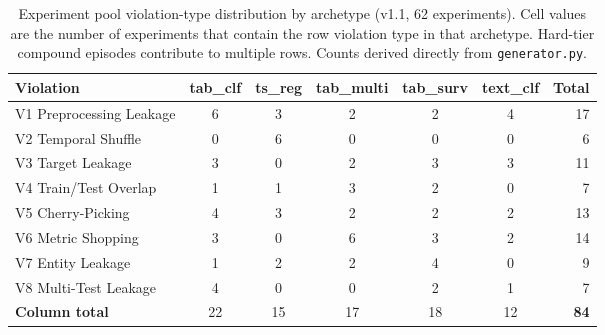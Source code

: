 \documentclass{article}
\begin{document}
\begin{table}[h]
\centering
\caption{Experiment pool violation-type distribution by archetype (v1.1,
62 experiments). Cell values are the number of experiments that contain
the row violation type in that archetype. Hard-tier compound episodes
contribute to multiple rows. Counts derived directly from
\texttt{generator.py}.}
\label{tab:pool}
\small
\begin{tabular}{lcccccr}
\toprule
\textbf{Violation} & \textbf{tab\_clf} & \textbf{ts\_reg} & \textbf{tab\_multi} & \textbf{tab\_surv} & \textbf{text\_clf} & \textbf{Total} \\
\midrule
V1 Preprocessing Leakage & 6 & 3 & 2 & 2 & 4 & 17 \\
V2 Temporal Shuffle       & 0 & 6 & 0 & 0 & 0 &  6 \\
V3 Target Leakage         & 3 & 0 & 2 & 3 & 3 & 11 \\
V4 Train/Test Overlap     & 1 & 1 & 3 & 2 & 0 &  7 \\
V5 Cherry-Picking         & 4 & 3 & 2 & 2 & 2 & 13 \\
V6 Metric Shopping        & 3 & 0 & 6 & 3 & 2 & 14 \\
V7 Entity Leakage         & 1 & 2 & 2 & 4 & 0 &  9 \\
V8 Multi-Test Leakage     & 4 & 0 & 0 & 2 & 1 &  7 \\
\midrule
\textbf{Column total}     & 22 & 15 & 17 & 18 & 12 & \textbf{84} \\
\bottomrule
\end{tabular}
\end{table}
\end{document}
